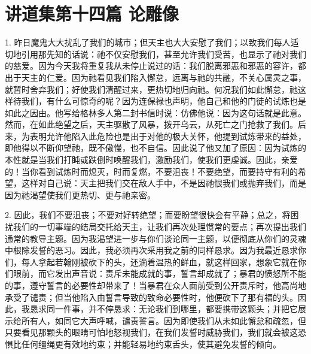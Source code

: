 

\section{讲道集第十四篇 论雕像}

\par

1. 昨日魔鬼大大扰乱了我们的城市；但天主也大大安慰了我们；以致我们每人适切地引用那先知的话说：祂不仅安慰我们，甚至允许我们受苦，也显示了祂对我们的慈爱。因为今天我将重复我从未停止说过的话：我们脱离邪恶和邪恶的容许，都出于天主的仁爱。因为祂看见我们陷入懈怠，远离与祂的共融，不关心属灵之事，就暂时舍弃我们；好使我们清醒过来，更热切地归向祂。何况我们如此懈怠，祂这样待我们，有什么可惊奇的呢？因为连保禄也声明，他自己和他的门徒的试炼也是如此之因由。他写给格林多人第二封书信时说：仿佛他说：因为这句话就是此意。然而，在如此绝望之后，天主驱散了风暴，拨开乌云，从死亡之门抢救了我们。后来，为表明允许他陷入此危险也是出于对他的极大关怀，他提到试炼带来的益处，即他得以不断仰望祂，既不傲慢，也不自信。因此说了他又加了原因：因为试炼的本性就是当我们打盹或跌倒时唤醒我们，激励我们，使我们更虔诚。因此，亲爱的！当你看到试炼时而熄灭，时而复燃，不要沮丧！不要绝望，而要持守有利的希望，这样对自己说：天主把我们交在敌人手中，不是因祂恨我们或抛弃我们，而是因为祂渴望使我们更热切、更与祂亲密。\par

2. 因此，我们不要沮丧；不要对好转绝望；而要盼望很快会有平静；总之，将困扰我们的一切事端的结局交托给天主，让我们再次处理惯常的要点；再次提出我们通常的教导主题。因为我渴望进一步与你们谈论同一主题，以便彻底从你们的灵魂中根除发誓的恶习。因此，我必须再次采用我之前的同样恳求。因为我最近恳求你们，每人拿起若翰刚被砍下的头，还滴着温热的鲜血，就这样回家，想象它就在你们眼前，而它发出声音说：责斥未能成就的事，誓言却成就了；暴君的愤怒所不能的事，遵守誓言的必要性却带来了！当暴君在众人面前受到公开责斥时，他高尚地承受了谴责；但当他陷入由誓言导致的致命必要性时，他便砍下了那有福的头。因此，我恳求同一件事，并不停恳求：无论我们到哪里，都要携带这颗头；并把它展示给所有人，如同它大声呼喊，谴责誓言。因为即使我们从未如此懈怠和疏忽，但只要看见那颗头的眼睛可怕地怒视我们，在我们发誓时威胁我们，我们就会被这恐惧比任何缰绳更有效地约束；并能轻易地约束舌头，使其避免发誓的倾向。\par

